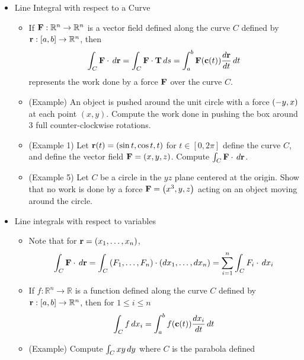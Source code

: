 \documentclass[11pt]{article}
\begin{document}
\begin{itemize}
  \item Line Integral with respect to a Curve
    \begin{itemize}
      \item If \(\mathbf{F}:\mathbb R^n\to\mathbb R^n\) is a vector field defined
            along the curve \(C\) defined by \(\mathbf{r}:[a,b]\to\mathbb R^n\),
            then
            \[
              \int_C \mathbf{F}\cdot\,d\mathbf{r}
                =
              \int_C \mathbf{F}\cdot\mathbf{T}\,d s
                =
              \int_a^b \mathbf{F}(\mathbf{c}(t))\frac{d\mathbf{r}}{dt}\,d t
            \]
            represents the work done by a force \(\mathbf{F}\) over the curve
            \(C\).
      \item (Example) An object is pushed around the unit circle with
            a force \(\left(-y,x\right)\) at each point \((x,y)\). Compute the
            work done in pushing the box around \(3\) full counter-clockwise
            rotations.
      \item (Example 1) Let \(\mathbf{r}(t)=\left(\sin t,\cos t,t\right)\)
            for \(t\in[0,2\pi]\)
            define the curve \(C\), and define the vector field
            \(\mathbf{F}=\left(x,y,z\right)\). Compute
            \(\int_C\mathbf{F}\cdot\,d\mathbf{r}\).
      \item (Example 5) Let \(C\) be a circle in the \(yz\) plane centered
            at the origin.
            Show that no work is done by a force \(\mathbf{F}=\left(x^3,y,z\right)\)
            acting on an object moving around the circle.
    \end{itemize}
  \item Line integrals with respect to variables
    \begin{itemize}
      \item Note that for \(\mathbf{r}=\left(x_1,\dots,x_n\right)\),
            \[
              \int_C \mathbf{F}\cdot\,d\mathbf{r}
                =
              \int_C \left(F_1,\dots,F_n\right)\cdot\left(dx_1,\dots,dx_n\right)
                =
              \sum_{i=1}^n \int_C F_i\cdot\,d x_i
            \]
      \item If \(f:\mathbb R^n\to\mathbb R\) is a function defined
            along the curve \(C\) defined by \(\mathbf{r}:[a,b]\to\mathbb R^n\),
            then for \(1\leq i\leq n\)
            \[
              \int_C f\,d x_i
                =
              \int_a^b f(\mathbf{c}(t))\frac{dx_i}{dt}\,d t
            \]
      \item (Example)
            Compute \(\int_C xy\,d y\) where \(C\) is the parabola defined

\end{itemize}
\end{itemize}
\end{document}
